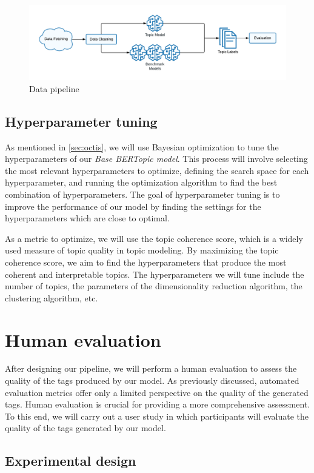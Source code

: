 \begin{figure}[h]
    \centering
    \includegraphics[width=\textwidth]{figures/data_pipeline.pdf}
    \caption{Data pipeline}
    \label{fig:data_pipeline}
\end{figure}

\subsection{Hyperparameter tuning}
As mentioned in \cref{sec:octis}, we will use Bayesian optimization to tune the hyperparameters of our \textit{Base BERTopic model}. This process will involve selecting the most relevant hyperparameters to optimize, defining the search space for each hyperparameter, and running the optimization algorithm to find the best combination of hyperparameters. The goal of hyperparameter tuning is to improve the performance of our model by finding the settings for the hyperparameters which are close to optimal.

As a metric to optimize, we will use the topic coherence score, which is a widely used measure of topic quality in topic modeling. By maximizing the topic coherence score, we aim to find the hyperparameters that produce the most coherent and interpretable topics. The hyperparameters we will tune include the number of topics, the parameters of the dimensionality reduction algorithm, the clustering algorithm, etc.

\section{Human evaluation}
After designing our pipeline, we will perform a human evaluation to assess the quality of the tags produced by our model. As previously discussed, automated evaluation metrics offer only a limited perspective on the quality of the generated tags. Human evaluation is crucial for providing a more comprehensive assessment. To this end, we will carry out a user study in which participants will evaluate the quality of the tags generated by our model.

\subsection{Experimental design}
